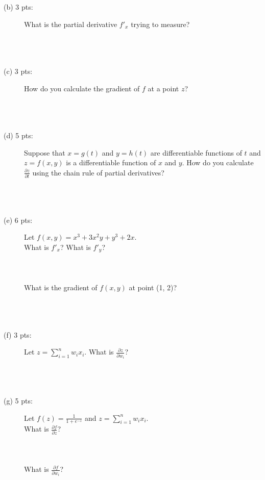 \documentclass[11pt]{article}
\begin{document}
\begin{description}
\begin{itemize}
  \end{itemize}

  
\item [(b) 3 pts:] What is the partial derivative $f'_x$ trying to measure?
     \\ \\ \\ \\


\item [(c) 3 pts:] How do you calculate the gradient of $f$ at a point $z$? \\ \\ \\ \\

\item [(d) 5 pts:]  Suppose that $x=g(t)$  and $y=h(t)$ are differentiable
  functions of $t$ and $z=f(x,y)$ is a differentiable function of
  $x$ and $y$. How do you calculate $\frac{\partial z}{\partial t}$ using the chain rule
  of partial derivatives?\\ \\ \\ \\

  
\item [(e) 6 pts:] Let $f(x,y)=x^3 + 3x^2y+y^3 + 2x$. \\
  
  What is $f'_x$?
  What is $f'_y$? \\ \\  \\ \\


  What is the gradient of $f(x, y)$ at point (1, 2)? \\ \\ \\ \\ 

  
  
\item [(f) 3 pts:] Let $z = \sum_{i=1}^n w_i x_i$.
  What is $\frac{\partial z}{\partial w_i}$? \\ \\ \\ \\
  
\item [(g) 5 pts:] Let $f(z)=\frac{1}{1+e^{-z}}$ and $z = \sum_{i=1}^n w_i x_i$. \\
       What is $\frac{\partial f}{\partial z}$? \\ \\ \\ \\  
       What is $\frac{\partial f}{\partial w_i}$? \\ \\ \\ \\


\end{description}
\end{document}
